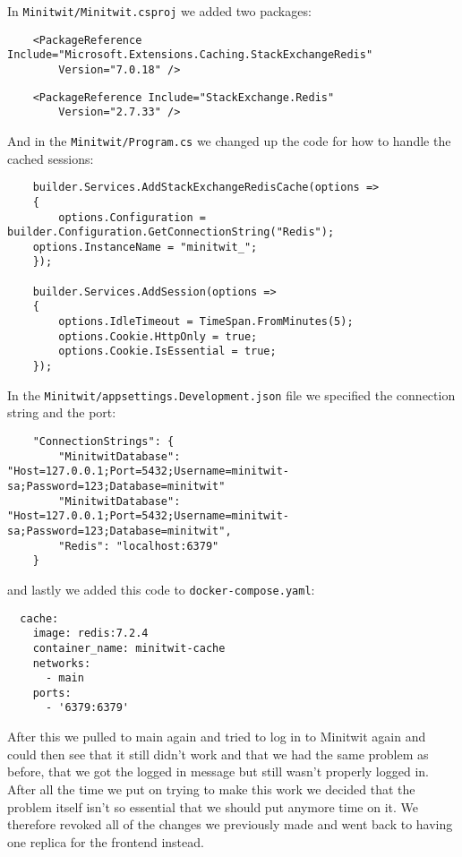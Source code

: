 In \texttt{Minitwit/Minitwit.csproj} we added two packages:

\begin{verbatim}
    <PackageReference Include="Microsoft.Extensions.Caching.StackExchangeRedis"
        Version="7.0.18" />
\end{verbatim}

\begin{verbatim}
    <PackageReference Include="StackExchange.Redis"
        Version="2.7.33" />
\end{verbatim}

And in the \texttt{Minitwit/Program.cs} we changed up the code for how to handle the cached sessions:

\begin{verbatim}
    builder.Services.AddStackExchangeRedisCache(options =>
    {
	    options.Configuration = builder.Configuration.GetConnectionString("Redis");
    options.InstanceName = "minitwit_";
    });

    builder.Services.AddSession(options =>
    {
        options.IdleTimeout = TimeSpan.FromMinutes(5);
        options.Cookie.HttpOnly = true;
        options.Cookie.IsEssential = true;
    });
\end{verbatim}

In the \texttt{Minitwit/appsettings.Development.json} file we specified the connection string and the port:

\begin{verbatim}
    "ConnectionStrings": {
        "MinitwitDatabase": "Host=127.0.0.1;Port=5432;Username=minitwit-sa;Password=123;Database=minitwit"
        "MinitwitDatabase": "Host=127.0.0.1;Port=5432;Username=minitwit-sa;Password=123;Database=minitwit",
        "Redis": "localhost:6379"
    }
\end{verbatim}

and lastly we added this code to \texttt{docker-compose.yaml}:

\begin{verbatim}
  cache:
    image: redis:7.2.4
    container_name: minitwit-cache
    networks:
      - main
    ports:
      - '6379:6379'
\end{verbatim}

After this we pulled to main again and tried to log in to Minitwit again and could then see that it still didn't work and that we had the same problem as before, that we got the logged in message but still wasn't properly logged in. After all the time we put on trying to make this work we decided that the problem itself isn't so essential that we should put anymore time on it. We therefore revoked all of the changes we previously made and went back to having one replica for the frontend instead.

